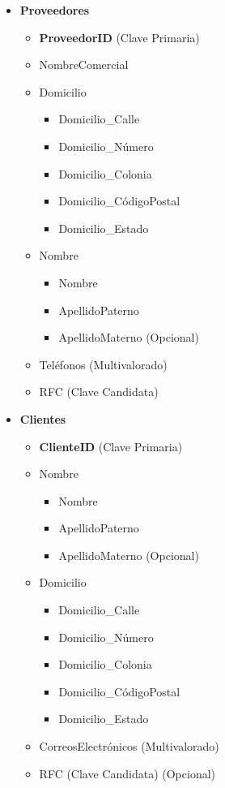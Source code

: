 \documentclass[10pt,openany]{book}
\begin{document}
\begin{itemize}
    \item \textbf{Proveedores}
        \begin{itemize}
            \item \textbf{ProveedorID} (Clave Primaria)
            \item NombreComercial
            \item Domicilio
            \begin{itemize}
                \item Domicilio\_Calle
                \item Domicilio\_Número
                \item Domicilio\_Colonia
                \item Domicilio\_CódigoPostal
                \item Domicilio\_Estado
            \end{itemize}
            \item Nombre
            \begin{itemize}
                \item Nombre
                \item ApellidoPaterno
                \item ApellidoMaterno (Opcional)
            \end{itemize}
            \item Teléfonos (Multivalorado)
            \item RFC (Clave Candidata)
        \end{itemize}
        
    \item \textbf{Clientes}
        \begin{itemize}
            \item \textbf{ClienteID} (Clave Primaria)
            \item Nombre
            \begin{itemize}
                \item Nombre
                \item ApellidoPaterno
                \item ApellidoMaterno (Opcional)
            \end{itemize}
            \item Domicilio
            \begin{itemize}
                \item Domicilio\_Calle
                \item Domicilio\_Número
                \item Domicilio\_Colonia
                \item Domicilio\_CódigoPostal
                \item Domicilio\_Estado
            \end{itemize}
            \item CorreosElectrónicos (Multivalorado)
            \item RFC (Clave Candidata) (Opcional)
        \end{itemize}
        

\end{itemize}
\end{document}
